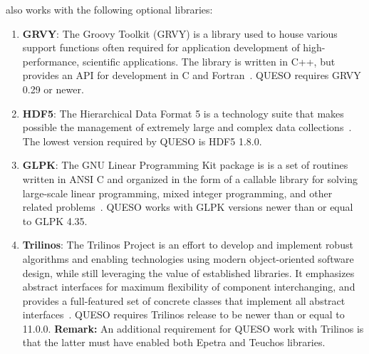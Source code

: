 \Queso{} also works with the following optional libraries:




\begin{enumerate}%


\item \textbf{GRVY}: The Groovy Toolkit (GRVY) is a library used to house various support functions often required for application development of high-performance, scientific applications. The library is written in C++, but provides an API for development in C and Fortran~\cite{grvy}. QUESO requires GRVY 0.29 or newer.

\item \textbf{HDF5}: The Hierarchical Data Format 5 is a technology suite that makes possible the management of extremely large and complex data collections~\cite{HDF5}. The lowest version required by QUESO is HDF5 1.8.0.

\item \textbf{GLPK}: The GNU Linear Programming Kit package is is a set of routines written in ANSI C and organized in the form of a callable library for solving large-scale linear programming, mixed integer programming, and other related problems~\cite{GLPK}. QUESO works with GLPK versions newer than or equal to  GLPK 4.35.
%
%
 \item{ \textbf{Trilinos}: The Trilinos Project is an effort to develop and implement robust algorithms and enabling technologies using modern object-oriented software design, while still leveraging the value of established libraries. It emphasizes abstract interfaces for maximum flexibility of component interchanging, and provides a full-featured set of concrete classes that implement all abstract interfaces~\cite{Trilinos,TrilinosPage}. QUESO requires Trilinos release to be newer than or equal to  11.0.0.
 {\bf Remark:} An additional requirement for QUESO work with Trilinos is that the latter must have enabled both Epetra and Teuchos libraries.}

\end{enumerate}%
%


